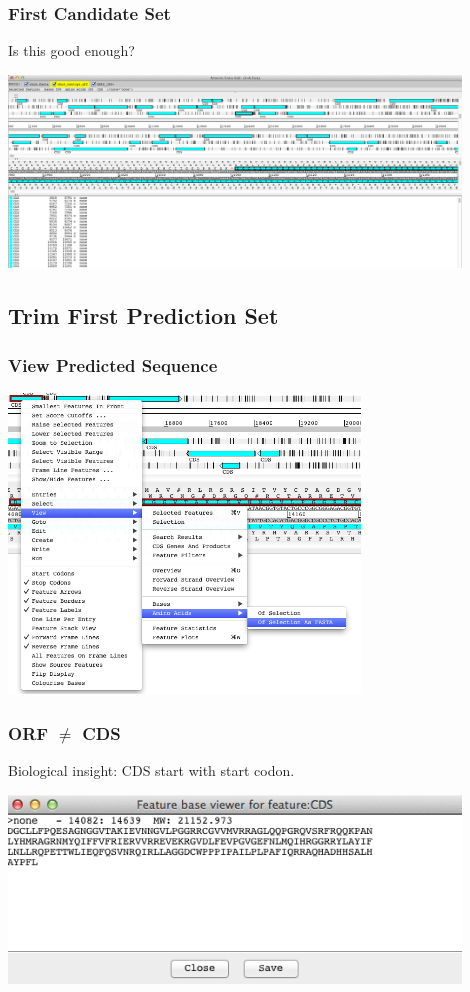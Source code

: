 \begin{frame}
  \frametitle{First Candidate Set} 
  Is this good enough?
  \begin{center}
    \includegraphics[width=0.9\textwidth]{images/artemis_orf4}     
  \end{center}
\end{frame}

\subsection{Trim First Prediction Set}
\begin{frame}
  \frametitle{View Predicted Sequence}    
  \begin{center}
    \includegraphics[width=0.7\textwidth]{images/artemis_orf5}     
  \end{center}
\end{frame}

\begin{frame}
  \frametitle{ORF $\neq$ CDS}
  Biological insight: CDS start with start codon.
  \begin{center}
    \includegraphics[width=0.9\textwidth]{images/artemis_orf6}     
  \end{center}
\end{frame}

